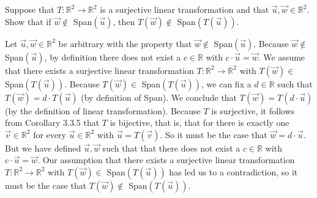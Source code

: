 \documentclass[12pt]{article}
\newenvironment{problem}[2][Problem]
{
	\begin{trivlist} 
		\item[\hskip \labelsep {\bfseries #1 #2:}]
	}
{
	\end{trivlist}
	}
\newenvironment{solution}[1][Solution]
{
	\begin{trivlist} 
		\item[\hskip \labelsep {\itshape #1:}]
	}
	{
	\end{trivlist}
}
\begin{document}
\newpage
\begin{problem}{2}
Suppose that $T:\mathbb{R}^2 \to \mathbb{R}^2$ is a surjective linear transformation and that $\vec{u},\vec{w} \in \mathbb{R}^2$. Show that if $\vec{w}\notin$ Span$(\vec{u})$, then $T(\vec{w}) \notin$ Span$(T(\vec{u}))$.
\noindent
\newline
\newline

\begin{solution}
Let $\vec{u}, \vec{w} \in \mathbb{R}^2$ be arbitrary with the property that $\vec{w} \notin$ Span$(\vec{u})$. Because $\vec{w} \notin$ Span$(\vec{u})$, by definition there does not exist a $c\in \mathbb{R}$ with $c \cdot \vec{u} = \vec{w}$. We assume that there exists a surjective linear transformation $T:\mathbb{R}^2 \to \mathbb{R}^2$ with $T(\vec{w}) \in$ Span$(T(\vec{u}))$. Because $T(\vec{w}) \in$ Span$(T(\vec{u}))$, we can fix a $d \in \mathbb{R}$ such that $T(\vec{w}) = d\cdot T(\vec{u})$ (by definition of Span). We conclude that $T(\vec{w}) = T(d\cdot \vec{u})$ (by the definition of linear transformation). Because $T$ is surjective, it follows from Corollary 3.3.5 that $T$ is bijective, that is, that for there is exactly one $\vec{v} \in \mathbb{R}^2$ for every $\vec{u} \in \mathbb{R}^2$ with $\vec{u}=T(\vec{v})$. So it must be the case that $\vec{w} = d\cdot \vec{u}$. But we have defined $\vec{u}, \vec{w}$ such that that there does not exist a $c\in \mathbb{R}$ with $c \cdot \vec{u} = \vec{w}$. Our assumption that there exists a surjective linear transformation $T:\mathbb{R}^2 \to \mathbb{R}^2$ with $T(\vec{w}) \in$ Span$(T(\vec{u}))$ has led us to a contradiction, so it must be the case that $T(\vec{w}) \notin$ Span$(T(\vec{u}))$.
\end{solution}
\end{problem}
\end{document}

